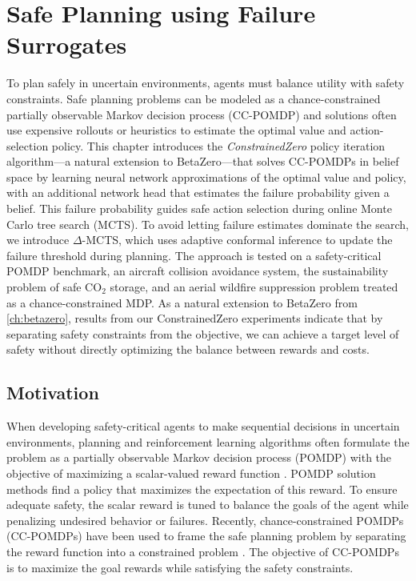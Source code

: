 \chapter{Safe Planning using Failure Surrogates}\label{ch:constrainedzero}

To plan safely in uncertain environments, agents must balance utility with safety constraints.
Safe planning problems can be modeled as a chance-constrained partially observable Markov decision process (CC-POMDP) and solutions often use expensive rollouts or heuristics to estimate the optimal value and action-selection policy.
This chapter introduces the \textit{ConstrainedZero} policy iteration algorithm---a natural extension to BetaZero---that solves CC-POMDPs in belief space by learning neural network approximations of the optimal value and policy, with an additional network head that estimates the failure probability given a belief.
This failure probability guides safe action selection during online Monte Carlo tree search (MCTS).
To avoid letting failure estimates dominate the search, we introduce $\Delta\text{-MCTS}$, which uses adaptive conformal inference to update the failure threshold during planning.
The approach is tested on a safety-critical POMDP benchmark, an aircraft collision avoidance system, the sustainability problem of safe CO$_2$ storage, and an aerial wildfire suppression problem treated as a chance-constrained MDP.
As a natural extension to BetaZero from \cref{ch:betazero}, results from our ConstrainedZero experiments indicate that by separating safety constraints from the objective, we can achieve a target level of safety without directly optimizing the balance between rewards and costs.

\section{Motivation}
When developing safety-critical agents to make sequential decisions in uncertain environments, planning and reinforcement learning algorithms often formulate the problem as a partially observable Markov decision process (POMDP) with the objective of maximizing a scalar-valued reward function \cite{dmbook}.
POMDP solution methods find a policy that maximizes the expectation of this reward.
To ensure adequate safety, the scalar reward is tuned to balance the goals of the agent while penalizing undesired behavior or failures.
Recently, chance-constrained POMDPs (CC-POMDPs) have been used to frame the safe planning problem by separating the reward function into a constrained problem \cite{santana2016rao}.
The objective of CC-POMDPs is to maximize the goal rewards while satisfying the safety constraints.

